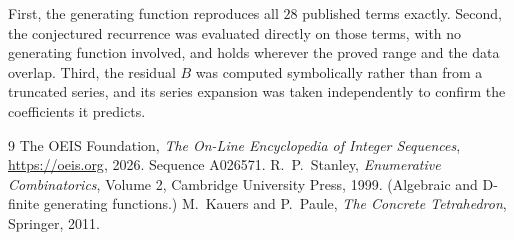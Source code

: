 \documentclass[11pt,a4paper]{article}
\theoremstyle{plain}
\theoremstyle{definition}
\begin{document}
First, the generating function reproduces all $28$ published terms exactly. Second,
the conjectured recurrence was evaluated directly on those terms, with no generating function
involved, and holds wherever the proved range and the data overlap. Third, the residual $B$ was
computed symbolically rather than from a truncated series, and its series expansion was taken
independently to confirm the coefficients it predicts.

\begin{thebibliography}{9}
 The OEIS Foundation, \emph{The On-Line Encyclopedia of Integer Sequences},
\url{https://oeis.org}, 2026. Sequence A026571.
 R.~P.~Stanley, \emph{Enumerative Combinatorics}, Volume 2, Cambridge
University Press, 1999. (Algebraic and D-finite generating functions.)
 M.~Kauers and P.~Paule, \emph{The Concrete Tetrahedron}, Springer, 2011.
\end{thebibliography}
\end{document}
